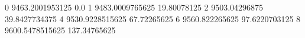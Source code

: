 0 9463.2001953125 0.0
1 9483.0009765625 19.80078125
2 9503.04296875 39.8427734375
4 9530.9228515625 67.72265625
6 9560.822265625 97.6220703125
8 9600.5478515625 137.34765625
